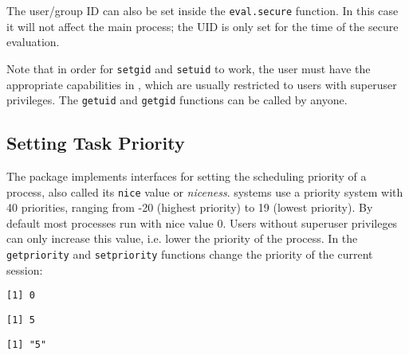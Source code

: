 

The user/group ID can also be set inside the \texttt{eval.secure} function. In
this case it will not affect the main process; the UID is only set for the time
of the secure evaluation.



Note that in order for \texttt{setgid} and \texttt{setuid} to work, the user
must have the appropriate capabilities in \Linux, which are usually
restricted to users with superuser privileges. The \texttt{getuid} and
\texttt{getgid} functions can be called by anyone.

\subsection{Setting Task Priority}
\label{priority}

The \RAppArmor package implements interfaces for setting the scheduling priority
of a process, also called its \texttt{nice} value or \emph{niceness}. \Linux
systems use a priority system with 40 priorities, ranging from -20 (highest
priority) to 19 (lowest priority). By default most processes run with nice
value 0. Users without superuser privileges can only increase this value, i.e.
lower the priority of the process. In \RAppArmor the \texttt{getpriority} and
\texttt{setpriority} functions change the priority of the current session:

\begin{knitrout}\mycodesize
{}\color{fgcolor}\begin{kframe}
\begin{alltt}
\hlstd{()}
\end{alltt}
\begin{verbatim}
[1] 0
\end{verbatim}
\begin{alltt}
\hlstd{(}\hlstd{)}
\end{alltt}
\begin{verbatim}
[1] 5
\end{verbatim}
\begin{alltt}
\hlstd{(}\hlstd{,}  \hlstd{=} \hlstd{)}
\end{alltt}
\begin{verbatim}
[1] "5"
\end{verbatim}
\begin{alltt}
\hlstd{(}\hlstd{)}
\end{alltt}


{\ttfamily\noindent\bfseries\color{errorcolor}{\#\# Error: Failed to set priority. }}\end{kframe}
\end{knitrout}


